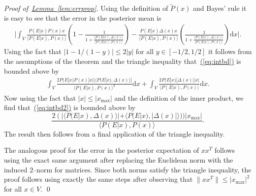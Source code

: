 \documentclass[twoside]{article}
\newenvironment{proofof}[1]{\begin{trivlist}\item[]{\flushleft\it
Proof of~#1.}}
{\qed\end{trivlist}}
\newcommand{\eq}[1]{\hyperref[eq:#1]{(\ref*{eq:#1})}}
\newcommand{\lem}[1]{\hyperref[lem:#1]{Lemma~\ref*{lem:#1}}}
\begin{document}
\begin{proofof}{\lem{errprop}}
Using the definition of $\tilde{P}(x)$ and Bayes' rule it is easy to see that the error in the posterior mean is
\begin{align}
\Biggr| \int_V \frac{P(E|x)P(x)x}{\langle P(E|x),P(x) \rangle}\left( 1 - \frac{1}{1+\frac{\langle P(E|x),\Delta(x)\rangle }{\langle P(E|x),P(x) \rangle}}\right) - \frac{P(E|x) \Delta(x)x}{\langle P(E|x),P(x)\rangle}\left(\frac{1}{1+\frac{\langle P(E|x),\Delta(x)\rangle }{\langle P(E|x),P(x) \rangle}} \right)\mathrm{d}x \Biggr|.\label{eq:intbd}
\end{align}
Using the fact that $|1-1/(1-y)| \le 2|y|$ for all $y\in [-1/2,1/2]$ it follows from the assumptions of the theorem and the triangle inequality that~\eq{intbd} is bounded above by
\begin{align}
 \int_V \frac{2P(E|x)P(x)|x| |\langle P(E|x),\Delta(x) \rangle|}{\langle P(E|x),P(x) \rangle^2}\mathrm{d}x+ \int_V\frac{2P(E|x) |\Delta(x)||x|}{\langle P(E|x),P(x)\rangle}\mathrm{d}x.\label{eq:intbd2}
\end{align}
Now using the fact that $|x|\le |x_{\max}|$ and the definition of the inner product, we find that~\eq{intbd2} is bounded above by
\begin{equation}
\frac{2 (|\langle P(E|x),\Delta(x) \rangle| + \langle P(E|x), |\Delta(x)| \rangle))|x_{\max}|}{\langle P(E|x),P(x)\rangle}.
\end{equation}
The  result then follows from a final application of the triangle inequality.

The analogous proof for the error in the posterior expectation of $xx^T$ follows using the exact same argument after replacing the Euclidean norm with the induced $2$--norm for matrices.  Since both norms satisfy the triangle inequality, the proof follows using exactly the same steps after observing that $\|xx^T\|\le |x_{\max}|^2$ for all $x\in V$.
\end{proofof}
\end{document}
